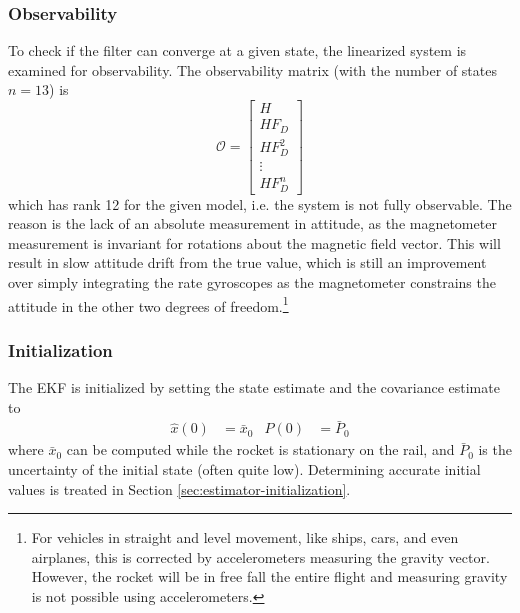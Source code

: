 \subsubsection{Observability}
To check if the filter can converge at a given state, the linearized system is examined for observability.
The observability matrix (with the number of states $n=13$) is 
\begin{equation}
    \mathcal{O} = \begin{bmatrix}
        H \\ H F_D \\ H F_D^2 \\ \vdots \\ H F_D^n
    \end{bmatrix}
\end{equation}
which has rank 12 for the given model, i.e. the system is not fully observable. 
The reason is the lack of an absolute measurement in attitude, as the magnetometer measurement is invariant for rotations about the magnetic field vector. 
This will result in slow attitude drift from the true value, which is still an improvement over simply integrating the rate gyroscopes as the magnetometer constrains the attitude in the other two degrees of freedom.\footnote{For vehicles in straight and level movement, like ships, cars, and even airplanes, this is corrected by accelerometers measuring the gravity vector. However, the rocket will be in free fall the entire flight and measuring gravity is not possible using accelerometers.}

\subsubsection{Initialization}
The EKF is initialized by setting the state estimate and the covariance estimate to 
\begin{align}
    \hat x (0) &= \bar x_0 & P(0) &= \bar P_0
\end{align}
where $\bar x_0$ can be computed while the rocket is stationary on the rail, and $\bar P_0$ is the uncertainty of the initial state (often quite low).
Determining accurate initial values is treated in Section \ref{sec:estimator-initialization}.  


